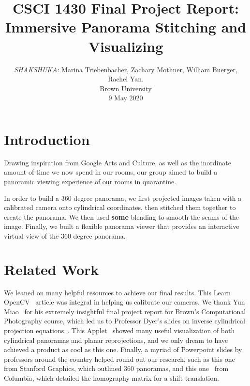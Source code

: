 \documentclass[10pt,twocolumn,letterpaper]{article}
\begin{document}
\title{CSCI 1430 Final Project Report:\\Immersive Panorama Stitching and Visualizing}

\author{\emph{SHAKSHUKA}: Marina Triebenbacher, Zachary Mothner, William Buerger, Rachel Yan.\\
Brown University\\
9 May 2020
}

\maketitle

\section{Introduction}

Drawing inspiration from Google Arts and Culture, as well as the inordinate amount of time we now spend in our rooms, our group aimed to build a panoramic viewing experience of our rooms in quarantine.

In order to build a 360 degree panorama, we first projected images taken with a calibrated camera onto cylindrical coordinates, then stitched them together to create the panorama. We then used \textbf{some} blending to smooth the seams of the image. Finally, we built a flexible panorama viewer that provides an interactive virtual view of the 360 degree panorama.

\section{Related Work}

We leaned on many helpful resources to achieve our final results. This Learn OpenCV~\cite{sadekar20} article was integral in helping us calibrate our cameras. We thank Yun Miao~\cite{miao12} for his extremely insightful final project report for Brown's Computational Photography course, which led us to Professor Dyer's slides on inverse cylindrical projection equations~\cite{dyer}. This Applet~\cite{dektar12} showed many useful visualization of both cylindrical panoramas and planar reprojections, and we only dream to have achieved a product as cool as this one. Finally, a myriad of Powerpoint slides by professors around the country helped round out our research, such as this one~\cite{kari10} from Stanford Graphics, which outlined 360 panoramas, and this one~\cite{seitz} from Columbia, which detailed the homography matrix for a shift translation.
\end{document}

